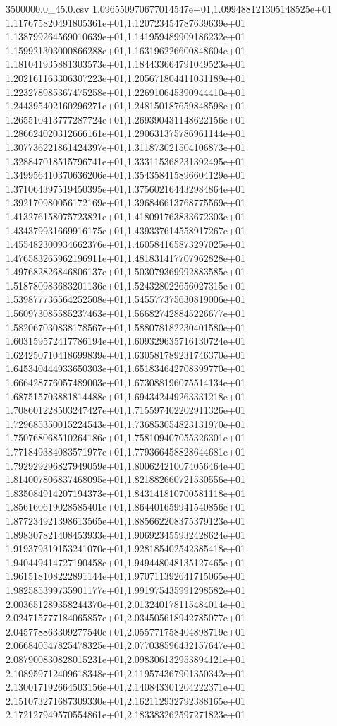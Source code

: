 \begin{filecontents*}{3500000.0_45.0.csv}
1.096550970677014547e+01,1.099488121305148525e+01
1.117675820491805361e+01,1.120723454787639639e+01
1.138799264569010639e+01,1.141959489909186232e+01
1.159921303000866288e+01,1.163196226600848604e+01
1.181041935881303573e+01,1.184433664791049523e+01
1.202161163306307223e+01,1.205671804411031189e+01
1.223278985367475258e+01,1.226910645390944410e+01
1.244395402160296271e+01,1.248150187659848598e+01
1.265510413777287724e+01,1.269390431148622156e+01
1.286624020312666161e+01,1.290631375786961144e+01
1.307736221861424397e+01,1.311873021504106873e+01
1.328847018515796741e+01,1.333115368231392495e+01
1.349956410370636206e+01,1.354358415896604129e+01
1.371064397519450395e+01,1.375602164432984864e+01
1.392170980056172169e+01,1.396846613768775569e+01
1.413276158075723821e+01,1.418091763833672303e+01
1.434379931669916175e+01,1.439337614558917267e+01
1.455482300934662376e+01,1.460584165873297025e+01
1.476583265962196911e+01,1.481831417707962828e+01
1.497682826846806137e+01,1.503079369992883585e+01
1.518780983683201136e+01,1.524328022656027315e+01
1.539877736564252508e+01,1.545577375630819006e+01
1.560973085585237463e+01,1.566827428845226677e+01
1.582067030838178567e+01,1.588078182230401580e+01
1.603159572417786194e+01,1.609329635716130724e+01
1.624250710418699839e+01,1.630581789231746370e+01
1.645340444933650303e+01,1.651834642708399770e+01
1.666428776057489003e+01,1.673088196075514134e+01
1.687515703881814488e+01,1.694342449263331218e+01
1.708601228503247427e+01,1.715597402202911326e+01
1.729685350015224543e+01,1.736853054823131970e+01
1.750768068510264186e+01,1.758109407055326301e+01
1.771849384083571977e+01,1.779366458828644681e+01
1.792929296827949059e+01,1.800624210074056464e+01
1.814007806837468095e+01,1.821882660721530556e+01
1.835084914207194373e+01,1.843141810700581118e+01
1.856160619028585401e+01,1.864401659941540856e+01
1.877234921398613565e+01,1.885662208375379123e+01
1.898307821408453933e+01,1.906923455932428624e+01
1.919379319153241070e+01,1.928185402542385418e+01
1.940449414727190458e+01,1.949448048135127465e+01
1.961518108222891144e+01,1.970711392641715065e+01
1.982585399735901177e+01,1.991975435991298582e+01
2.003651289358244370e+01,2.013240178115484014e+01
2.024715777184065857e+01,2.034505618942785077e+01
2.045778863309277540e+01,2.055771758404898719e+01
2.066840547825478325e+01,2.077038596432157647e+01
2.087900830828015231e+01,2.098306132953894121e+01
2.108959712409618348e+01,2.119574367901350342e+01
2.130017192664503156e+01,2.140843301204222371e+01
2.151073271687309330e+01,2.162112932792388165e+01
2.172127949570554861e+01,2.183383262597271823e+01

\end{filecontents*}
